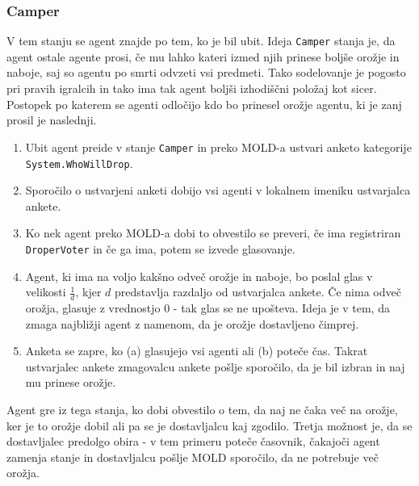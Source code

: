 \documentclass[a4paper,10pt]{article}
\begin{document}
\subsubsection{Camper} \label{sec:states-camper}
V tem stanju se agent znajde po tem, ko je bil ubit. Ideja \verb+Camper+ stanja je, da agent ostale agente prosi, če mu lahko kateri izmed njih prinese boljše 
orožje in naboje, saj so agentu po smrti odvzeti vsi predmeti. Tako sodelovanje je pogosto pri pravih igralcih in tako ima tak agent boljši izhodiščni položaj 
kot sicer.\\
Postopek po katerem se agenti odločijo kdo bo prinesel orožje agentu, ki je zanj prosil je naslednji.
\begin{enumerate}
 \item Ubit agent preide v stanje \verb+Camper+ in preko MOLD-a ustvari anketo kategorije \verb+System.WhoWillDrop+.
 \item Sporočilo o ustvarjeni anketi dobijo vsi agenti v lokalnem imeniku ustvarjalca ankete.
 \item Ko nek agent preko MOLD-a dobi to obvestilo se preveri, če ima registriran \verb+DroperVoter+ in če
       ga ima, potem se izvede glasovanje. 
 \item Agent, ki ima na voljo kakšno odveč orožje in naboje, bo poslal glas v velikosti $\frac{1}{d}$, kjer $d$ predstavlja razdaljo od ustvarjalca ankete. 
       Če nima odveč orožja, glasuje z vrednostjo 0 - tak glas se ne upošteva. Ideja je v tem, da zmaga najbližji agent z namenom, da je orožje 
       dostavljeno čimprej.
 \item Anketa se zapre, ko (a) glasujejo vsi agenti ali (b) poteče čas. Takrat ustvarjalec ankete zmagovalcu ankete pošlje sporočilo, da je bil izbran in naj 
       mu prinese orožje.
\end{enumerate}
Agent gre iz tega stanja, ko dobi obvestilo o tem, da naj ne čaka več na orožje, ker je to orožje dobil ali pa se je dostavljalcu kaj zgodilo.
Tretja možnost je, da se dostavljalec predolgo obira - v tem primeru poteče časovnik, čakajoči agent zamenja stanje in dostavljalcu pošlje MOLD sporočilo,
da ne potrebuje več orožja.
\end{document}
